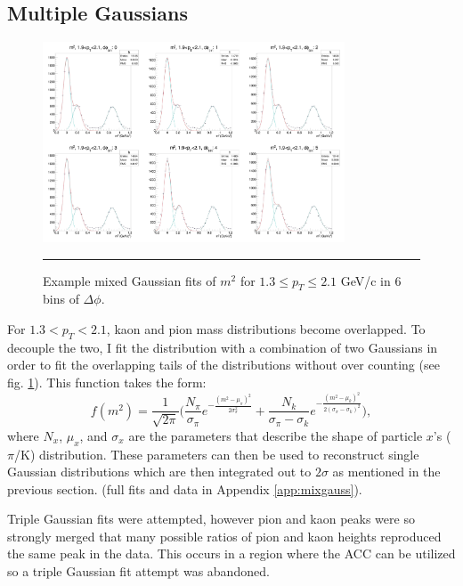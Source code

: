 \subsection{Multiple Gaussians}
\begin{figure}[htbp!]
  \centering
    \includegraphics[width=0.8\textwidth]{lowptfits/yieldvsdphi_tof1_cent0_ch1_pT-19-21.jpg}
    \rule{35em}{0.5pt}
  \caption[Example mixed Gaussian fits of $m^2$ for $1.3 \leq p_T\leq 2.1$ GeV/c in 6 bins of $\Delta \phi$.]{Example mixed Gaussian fits of $m^2$ for $1.3 \leq p_T\leq 2.1$ GeV/c in 6 bins of $\Delta \phi$.}
  \label{fig:mixgausm2}
\end{figure}
For $1.3<p_T<2.1$, kaon and pion mass distributions become overlapped. To decouple the two, I fit the distribution with a combination of two Gaussians in order to fit the overlapping tails of the distributions without over counting (see fig. \ref{fig:mixgausm2}). This function takes the form:
\begin{equation}
f(m^2) = \frac{1}{\sqrt{2\pi}} \bigg( \frac{N_{\pi}}{\sigma_{\pi}} e^{-\frac{(m^2-\mu_{\pi})^2}{2\sigma_{\pi}^{2}}} + \frac{N_{k}}{\sigma_{\pi}-\sigma_{k}} e^{-\frac{(m^2-\mu_{k})^2}{2(\sigma_{\pi} - \sigma_{k})^{2}}} \bigg),
\end{equation}
where $N_{x}$, $\mu_x$, and $\sigma_x$ are the parameters that describe the shape of particle $x$'s ($\pi$/K) distribution. These parameters can then be used to reconstruct single Gaussian distributions which are then integrated out to $2\sigma$ as mentioned in the previous section.
(full fits and data in Appendix \ref{app:mixgauss}).

Triple Gaussian fits were attempted, however pion and kaon peaks were so strongly merged that many possible ratios of pion and kaon heights reproduced the same peak in the data. This occurs in a region where the ACC can be utilized so a triple Gaussian fit attempt was abandoned.

